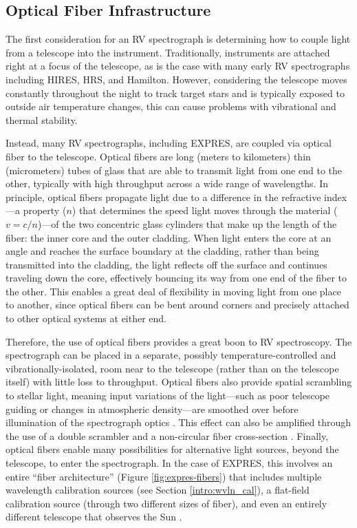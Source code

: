 \subsection{Optical Fiber Infrastructure} \label{intro:optics:fiber}

The first consideration for an RV spectrograph is determining how to couple light from a telescope into the instrument. Traditionally, instruments are attached right at a focus of the telescope, as is the case with many early RV spectrographs including HIRES, HRS, and Hamilton. However, considering the telescope moves constantly throughout the night to track target stars and is typically exposed to outside air temperature changes, this can cause problems with vibrational and thermal stability.

Instead, many RV spectrographs, including EXPRES, are coupled via optical fiber to the telescope. Optical fibers are long (meters to kilometers) thin (micrometers) tubes of glass that are able to transmit light from one end to the other, typically with high throughput across a wide range of wavelengths. In principle, optical fibers propagate light due to a difference in the refractive index---a property ($n$) that determines the speed light moves through the material ($v=c/n$)---of the two concentric glass cylinders that make up the length of the fiber: the inner core and the outer cladding. When light enters the core at an angle and reaches the surface boundary at the cladding, rather than being transmitted into the cladding, the light reflects off the surface and continues traveling down the core, effectively bouncing its way from one end of the fiber to the other. This enables a great deal of flexibility in moving light from one place to another, since optical fibers can be bent around corners and precisely attached to other optical systems at either end.

Therefore, the use of optical fibers provides a great boon to RV spectroscopy. The spectrograph can be placed in a separate, possibly temperature-controlled and vibrationally-isolated, room near to the telescope (rather than on the telescope itself) with little loss to throughput. Optical fibers also provide spatial scrambling to stellar light, meaning input variations of the light---such as poor telescope guiding or changes in atmospheric density---are smoothed over before illumination of the spectrograph optics \citep{hunter_scrambling_1992}. This effect can also be amplified through the use of a double scrambler \citep{halverson_efficient_2015, spronck_fiber_2015} and a non-circular fiber cross-section \citep{chazelas_new_2010, spronck_use_2012, plavchan_precision_2013}. Finally, optical fibers enable many possibilities for alternative light sources, beyond the telescope, to enter the spectrograph. In the case of EXPRES, this involves an entire ``fiber architecture'' (Figure \ref{fig:expres-fibers}) that includes multiple wavelength calibration sources (see Section \ref{intro:wvln_cal}), a flat-field calibration source (through two different sizes of fiber), and even an entirely different telescope that observes the Sun \citep{blackman_performance_2020}.

